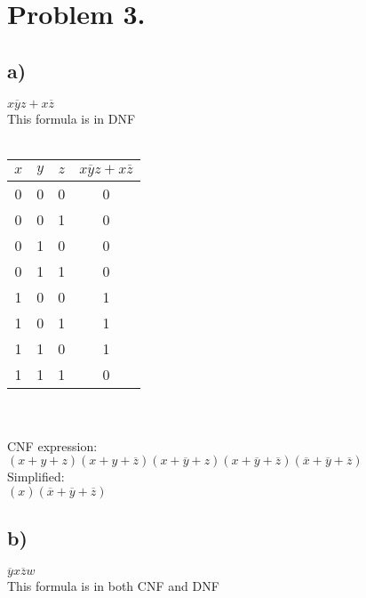 \documentclass{article}
\begin{document}
\section*{Problem 3.}
\subsection*{a)}
$x\overline{y}z+x\overline{z}$\\
This formula is in DNF\\
\vspace{0mm}\\
\begin{tabular}{| c | c | c || c |}
    \hline
    $x$ & $y$ & $z$ & $x\overline{y}z+x\overline{z}$ \\ \hline \hline
    0 & 0 & 0 & 0 \\ \hline
    0 & 0 & 1 & 0 \\ \hline
    0 & 1 & 0 & 0 \\ \hline
    0 & 1 & 1 & 0 \\ \hline
    1 & 0 & 0 & 1 \\ \hline
    1 & 0 & 1 & 1 \\ \hline
    1 & 1 & 0 & 1 \\ \hline
    1 & 1 & 1 & 0 \\ \hline
\end{tabular}\\
\vspace{0mm}\\
CNF expression:\\
$(x+y+z)(x+y+\overline{z})(x+\overline{y}+z)(x+\overline{y}+\overline{z})(\overline{x}+\overline{y}+\overline{z})$\\
Simplified:\\
$(x)(\overline{x}+\overline{y}+\overline{z})$
\subsection*{b)}
$\overline{y}x\overline{z}w$\\
This formula is in both CNF and DNF
\end{document}
